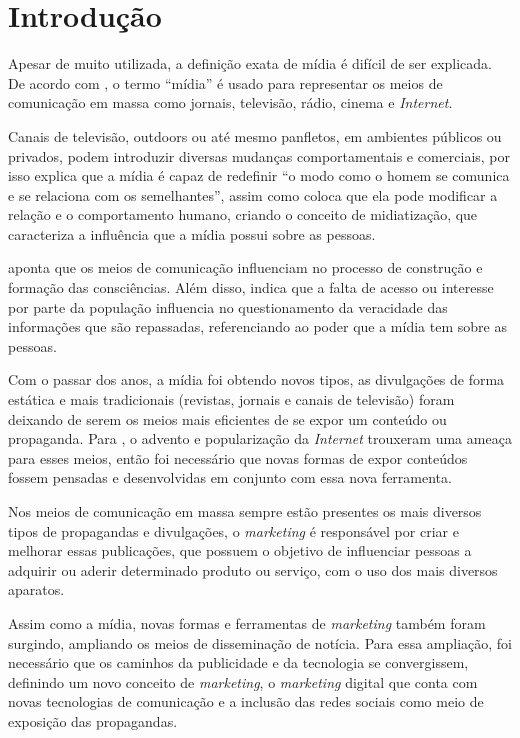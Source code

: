 \chapter[Introdução]{Introdução}
Apesar de muito utilizada, a definição exata de mídia é difícil de ser explicada. De acordo com \citet[p.51]{guazina2007}, o termo ``mídia'' é usado para representar os meios de comunicação em massa como jornais, televisão, rádio, cinema e \textit{Internet}.

Canais de televisão, outdoors ou até mesmo panfletos, em ambientes públicos ou privados, podem introduzir diversas mudanças comportamentais e comerciais, por isso \citet[p.3]{escobar2007} explica que a mídia é capaz de redefinir ``o modo como o homem se comunica e se relaciona com os semelhantes'', assim como \citet[p.54]{hjarvard2012} coloca que ela pode modificar a relação e o comportamento humano, criando o conceito de midiatização, que caracteriza a influência que a mídia possui sobre as pessoas.

\citet[p.53]{guazina2007} aponta que os meios de comunicação influenciam no processo de construção e formação das consciências. Além disso, \citet{silva2007} indica que a falta de acesso ou interesse por parte da população influencia no questionamento da veracidade das informações que são repassadas, referenciando ao poder que a mídia tem sobre as pessoas.

Com o passar dos anos, a mídia foi obtendo novos tipos, as divulgações de forma estática e mais tradicionais (revistas, jornais e canais de televisão) foram deixando de serem os meios mais eficientes de se expor um conteúdo ou propaganda. Para \citet{meditsch2001}, o advento e popularização da \textit{Internet} trouxeram uma ameaça para esses meios, então foi necessário que novas formas de expor conteúdos fossem pensadas e desenvolvidas em conjunto com essa nova ferramenta.

Nos meios de comunicação em massa sempre estão presentes os mais diversos tipos de propagandas e divulgações, o \textit{marketing} é responsável por criar e melhorar essas publicações, que possuem o objetivo de influenciar pessoas a adquirir ou aderir determinado produto ou serviço, com o uso dos mais diversos aparatos.

Assim como a mídia, novas formas e ferramentas de \textit{marketing} também foram surgindo, ampliando os meios de disseminação de notícia. Para essa ampliação, foi necessário que os caminhos da publicidade e da tecnologia se convergissem, definindo um novo conceito de \textit{marketing}, o \textit{marketing} digital que conta com novas tecnologias de comunicação e a inclusão das redes sociais como meio de exposição das propagandas.

